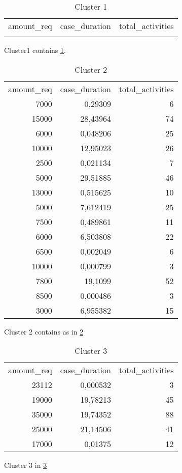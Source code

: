 \begin{table}[ht]
  \centering
  \caption{Cluster 1}
    \begin{tabular}{rrr}
    \multicolumn{1}{l}{amount\_req} & \multicolumn{1}{l}{case\_duration} & \multicolumn{1}{l}{total\_activities} \\
          &       &  \\
    \end{tabular}%
  \label{tab:clust1}%
\end{table}%
Cluster1 contains \ref{tab:clust1}.

\begin{table}[htbp]
  \centering
  \caption{Cluster 2}
    \begin{tabular}{rrr}
    \multicolumn{1}{l}{amount\_req} & \multicolumn{1}{l}{case\_duration} & \multicolumn{1}{l}{total\_activities} \\
    7000  & 0,29309 & 6 \\
    15000 & 28,43964 & 74 \\
    6000  & 0,048206 & 25 \\
    10000 & 12,95023 & 26 \\
    2500  & 0,021134 & 7 \\
    5000  & 29,51885 & 46 \\
    13000 & 0,515625 & 10 \\
    5000  & 7,612419 & 25 \\
    7500  & 0,489861 & 11 \\
    6000  & 6,503808 & 22 \\
    6500  & 0,002049 & 6 \\
    10000 & 0,000799 & 3 \\
    7800  & 19,1099 & 52 \\
    8500  & 0,000486 & 3 \\
    3000  & 6,955382 & 15 \\
    \end{tabular}%
  \label{tab:clust2}%
\end{table}%

Cluster 2 contains as in \ref{tab:clust2}


\begin{table}[htbp]
  \centering
  \caption{Cluster 3}
       \begin{tabular}{rrr}
    \multicolumn{1}{l}{amount\_req} & \multicolumn{1}{l}{case\_duration} & \multicolumn{1}{l}{total\_activities} \\
    23112 & 0,000532 & 3 \\
    19000 & 19,78213 & 45 \\
    35000 & 19,74352 & 88 \\
    25000 & 21,14506 & 41 \\
    17000 & 0,01375 & 12 \\
    \end{tabular}%
  \label{tab:clust3}%
\end{table}%

Cluster 3 in \ref{tab:clust3}
